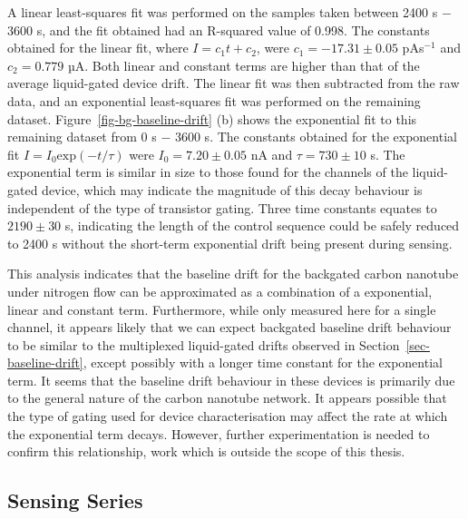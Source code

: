 \documentclass[
  a4paper,
]{scrbook}
\begin{document}
A linear least-squares fit was performed on the samples taken between
2400 s \(-\) 3600 s, and the fit obtained had an R-squared value of
0.998. The constants obtained for the linear fit, where
\(I = c_1t + c_2\), were \(c_1 = -17.31\pm0.05\) pAs\(^{-1}\) and
\(c_2 = 0.779\) µA. Both linear and constant terms are higher than that
of the average liquid-gated device drift. The linear fit was then
subtracted from the raw data, and an exponential least-squares fit was
performed on the remaining dataset. Figure~\ref{fig-bg-baseline-drift}
(b) shows the exponential fit to this remaining dataset from 0 s \(-\)
3600 s. The constants obtained for the exponential fit
\(I = I_0 \textrm{exp}(-t/\tau)\) were \(I_0 = 7.20 \pm 0.05\) nA and
\(\tau = 730 \pm 10\) s. The exponential term is similar in size to
those found for the channels of the liquid-gated device, which may
indicate the magnitude of this decay behaviour is independent of the
type of transistor gating. Three time constants equates to
\(2190 \pm 30\) s, indicating the length of the control sequence could
be safely reduced to 2400 s without the short-term exponential drift
being present during sensing.

This analysis indicates that the baseline drift for the backgated carbon
nanotube under nitrogen flow can be approximated as a combination of a
exponential, linear and constant term. Furthermore, while only measured
here for a single channel, it appears likely that we can expect
backgated baseline drift behaviour to be similar to the multiplexed
liquid-gated drifts observed in Section~\ref{sec-baseline-drift}, except
possibly with a longer time constant for the exponential term. It seems
that the baseline drift behaviour in these devices is primarily due to
the general nature of the carbon nanotube network. It appears possible
that the type of gating used for device characterisation may affect the
rate at which the exponential term decays. However, further
experimentation is needed to confirm this relationship, work which is
outside the scope of this thesis.

\hypertarget{sec-vapour-series}{%
\subsection{Sensing Series}\label{sec-vapour-series}}
\end{document}
